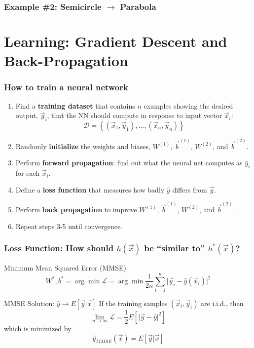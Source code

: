 \documentclass{beamer}
\begin{document}
\begin{frame}
  \frametitle{Example \#2: Semicircle $\rightarrow$ Parabola}

  \centerline{}
\end{frame}

\section[Learning]{Learning: Gradient Descent  and Back-Propagation}
\setcounter{subsection}{1}

\begin{frame}
  \frametitle{How to train a neural network}
  \begin{enumerate}
  \item Find a {\bf training dataset} that contains $n$ examples showing the
    desired output, $\vec{y}_i$, that the NN should compute in
    response to input vector $\vec{x}_i$:
    \[
    {\mathcal D}=\left\{(\vec{x}_1,\vec{y}_1),\ldots,(\vec{x}_n,\vec{y}_n)\right\}
    \]
    \item Randomly {\bf initialize} the weights and biases, $W^{(1)}$,
      $\vec{b}^{(1)}$, $W^{(2)}$, and $\vec{b}^{(2)}$.
    \item Perform {\bf forward propagation}: find out what the neural
      net computes as $\hat{y}_i$ for each $\vec{x}_i$.
    \item Define a {\bf loss function} that measures
      how badly $\hat{y}$ differs from $\vec{y}$.
    \item Perform {\bf back propagation} to improve  $W^{(1)}$,
      $\vec{b}^{(1)}$, $W^{(2)}$, and $\vec{b}^{(2)}$.
    \item Repeat steps 3-5 until convergence.
  \end{enumerate}
\end{frame}

\begin{frame}
  \frametitle{Loss Function: How should $h(\vec{x})$ be
    ``similar to'' $h^*(\vec{x})$?}
  \begin{block}{Minimum Mean Squared Error (MMSE)}
    \[
    W^*,b^*=\arg\min {\mathcal L} = \arg\min\frac{1}{2n}\sum_{i=1}^n
    \vert\vec{y}_{i}-\hat{y}(\vec{x}_i)\vert^2
    \]
  \end{block}
  \begin{block}{MMSE Solution: $\hat{y}\rightarrow E\left[\vec{y}|\vec{x}\right]$}
    If the training samples $(\vec{x}_i,\vec{y}_i)$ are i.i.d., then
    \[
    \lim_{n\rightarrow\infty}{\mathcal L} = \frac{1}{2}E\left[\vert\vec{y}-\hat{y}\vert^2\right]
    \]
    which is minimized by
    \[
    \hat{y}_{MMSE}(\vec{x})=E\left[\vec{y}|\vec{x}\right]
    \]
  \end{block}
\end{frame}
\end{document}
